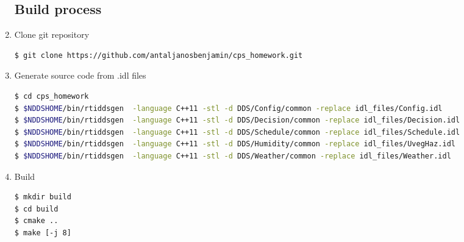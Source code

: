 \documentclass{article}
\begin{document}
\begin{enumerate}

\subsection{Build process}
\item Clone git repository
\begin{lstlisting}
$ git clone https://github.com/antaljanosbenjamin/cps_homework.git
\end{lstlisting}
\item Generate source code from .idl files
\begin{lstlisting}[language=bash]
$ cd cps_homework
$ $NDDSHOME/bin/rtiddsgen  -language C++11 -stl -d DDS/Config/common -replace idl_files/Config.idl
$ $NDDSHOME/bin/rtiddsgen  -language C++11 -stl -d DDS/Decision/common -replace idl_files/Decision.idl
$ $NDDSHOME/bin/rtiddsgen  -language C++11 -stl -d DDS/Schedule/common -replace idl_files/Schedule.idl
$ $NDDSHOME/bin/rtiddsgen  -language C++11 -stl -d DDS/Humidity/common -replace idl_files/UvegHaz.idl
$ $NDDSHOME/bin/rtiddsgen  -language C++11 -stl -d DDS/Weather/common -replace idl_files/Weather.idl
\end{lstlisting}
\item Build
\begin{lstlisting}
$ mkdir build
$ cd build
$ cmake ..
$ make [-j 8]
\end{lstlisting}
\end{enumerate}
\end{document}
